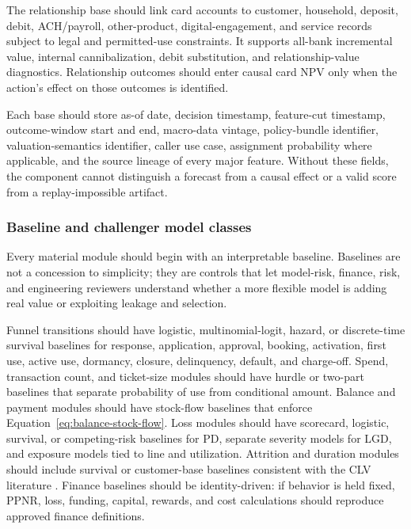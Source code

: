 \documentclass[11pt]{article}
\newcommand{\1}{\mathbf{1}}
\begin{document}
The relationship base should link card accounts to customer, household,
deposit, debit, ACH/payroll, other-product, digital-engagement, and service
records subject to legal and permitted-use constraints. It supports all-bank
incremental value, internal cannibalization, debit substitution, and
relationship-value diagnostics. Relationship outcomes should enter causal card
NPV only when the action's effect on those outcomes is identified.

Each base should store as-of date, decision timestamp, feature-cut timestamp,
outcome-window start and end, macro-data vintage, policy-bundle identifier,
valuation-semantics identifier, caller use case, assignment probability where
applicable, and the source lineage of every major feature. Without these
fields, the component cannot distinguish a forecast from a causal effect or a
valid score from a replay-impossible artifact.

\subsubsection{Baseline and challenger model classes}
\label{subsec:model-classes}

Every material module should begin with an interpretable baseline. Baselines
are not a concession to simplicity; they are controls that let model-risk,
finance, risk, and engineering reviewers understand whether a more flexible
model is adding real value or exploiting leakage and selection.

Funnel transitions should have logistic, multinomial-logit, hazard, or
discrete-time survival baselines for response, application, approval, booking,
activation, first use, active use, dormancy, closure, delinquency, default,
and charge-off. Spend, transaction count, and ticket-size modules should have
hurdle or two-part baselines that separate probability of use from conditional
amount. Balance and payment modules should have stock-flow baselines that
enforce Equation~\eqref{eq:balance-stock-flow}. Loss modules should have
scorecard, logistic, survival, or competing-risk baselines for PD, separate
severity models for LGD, and exposure models tied to line and utilization.
Attrition and duration modules should include survival or customer-base
baselines consistent with the CLV literature
\citep{schmittlein1987counting,fader2005bgnbd,bolton1998duration}. Finance
baselines should be identity-driven: if behavior is held fixed, PPNR, loss,
funding, capital, rewards, and cost calculations should reproduce approved
finance definitions.
\end{document}
